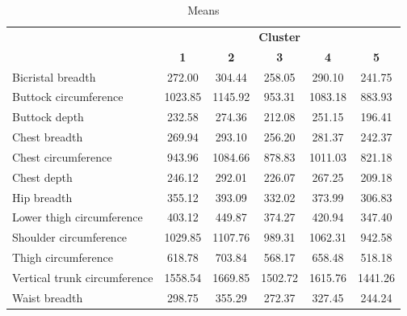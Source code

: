 \documentclass[12pt,a4paper,openany,UKenglish]{scrreprt}
\begin{document}
\begin{table}[H]
	\footnotesize
	\centering
	\caption{Means}
	\begin{tabular}{lccccc}
		\cline{2-6}
		                             & \multicolumn{5}{c}{\textbf{Cluster}}                                                             \\
		                             & \textbf{1}                           & \textbf{2}   & \textbf{3}   & \textbf{4}   & \textbf{5}   \\
		\hline\hline
		Bicristal breadth            & 272.00                               & 304.44       & 258.05       & 290.10       & 241.75       \\
		Buttock circumference        & 1023.85                              & 1145.92      & 953.31       & 1083.18      & 883.93       \\
		Buttock depth                & 232.58                               & 274.36       & 212.08       & 251.15       & 196.41       \\
		Chest breadth                & 269.94                               & 293.10       & 256.20       & 281.37       & 242.37       \\
		Chest circumference          & 943.96                               & 1084.66      & 878.83       & 1011.03      & 821.18       \\
		Chest depth                  & 246.12                               & 292.01       & 226.07       & 267.25       & 209.18       \\
		Hip breadth                  & 355.12                               & 393.09       & 332.02       & 373.99       & 306.83       \\
		Lower thigh circumference    & 403.12                               & 449.87       & 374.27       & 420.94       & 347.40       \\
		Shoulder circumference       & 1029.85                              & 1107.76      & 989.31       & 1062.31      & 942.58       \\
		Thigh circumference          & 618.78                               & 703.84       & 568.17       & 658.48       & 518.18       \\
		Vertical trunk circumference & 1558.54                              & 1669.85      & 1502.72      & 1615.76      & 1441.26      \\
		Waist breadth                & 298.75                               & 355.29       & 272.37       & 327.45       & 244.24       \\

\end{tabular}
\end{table}
\end{document}
